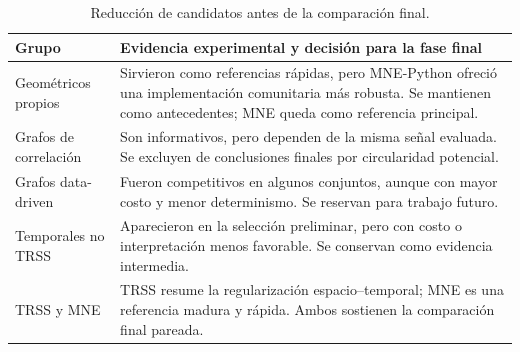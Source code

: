 \begin{table}[H]
\centering
\small
\setlength{\tabcolsep}{5pt}
\caption{Reducción de candidatos antes de la comparación final.}
\label{tab:ch4_candidate_reduction_decisions}
\begin{tabular}{@{}>{\raggedright\arraybackslash}p{3.2cm}>{\raggedright\arraybackslash}p{8.1cm}@{}}
\toprule
Grupo & Evidencia experimental y decisión para la fase final \\
\midrule
Geométricos propios & Sirvieron como referencias rápidas, pero MNE-Python ofreció una implementación comunitaria más robusta. Se mantienen como antecedentes; MNE queda como referencia principal. \\
Grafos de correlación & Son informativos, pero dependen de la misma señal evaluada. Se excluyen de conclusiones finales por circularidad potencial. \\
Grafos data-driven & Fueron competitivos en algunos conjuntos, aunque con mayor costo y menor determinismo. Se reservan para trabajo futuro. \\
Temporales no TRSS & Aparecieron en la selección preliminar, pero con costo o interpretación menos favorable. Se conservan como evidencia intermedia. \\
TRSS y MNE & TRSS resume la regularización espacio--temporal; MNE es una referencia madura y rápida. Ambos sostienen la comparación final pareada. \\
\bottomrule
\end{tabular}
\end{table}
